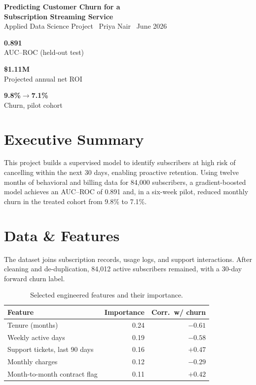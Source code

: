 \documentclass[11pt]{article}
\newcommand{\metric}[4]{%
\begin{minipage}[t]{0.31\linewidth}
\begin{tcolorbox}[colback=light,colframe=light,boxrule=0pt,arc=2mm,left=3mm,right=3mm,
  top=3mm,bottom=3mm,borderline west={2.5pt}{0pt}{#1},halign=center,height=2.1cm,valign=center]
{\LARGE\bfseries\color{navy}#2}\\[2pt]{\scriptsize\color{mist}#3}
\end{tcolorbox}
\end{minipage}}
\begin{document}
\begin{tcolorbox}[colback=navy,colframe=navy,arc=3mm,left=12pt,top=9pt,bottom=9pt]
{\color{white}\fontsize{20}{22}\selectfont\bfseries Predicting Customer Churn for a\\ Subscription Streaming Service}\\[3pt]
{\color{accent!50}\small Applied Data Science Project \textbullet\ Priya Nair \textbullet\ June 2026}
\end{tcolorbox}

\vspace{2pt}
\noindent
\metric{accent}{0.891}{AUC--ROC (held-out test)}{}\hfill
\metric{good}{\$1.11M}{Projected annual net ROI}{}\hfill
\metric{bad}{9.8\%$\to$7.1\%}{Churn, pilot cohort}{}

\section{Executive Summary}
This project builds a supervised model to identify subscribers at high risk of cancelling
within the next 30 days, enabling proactive retention. Using twelve months of behavioral and
billing data for 84,000 subscribers, a gradient-boosted model achieves an AUC--ROC of 0.891
and, in a six-week pilot, reduced monthly churn in the treated cohort from 9.8\% to 7.1\%.

\section{Data \& Features}
The dataset joins subscription records, usage logs, and support interactions. After cleaning
and de-duplication, 84,012 active subscribers remained, with a 30-day forward churn label.

\begin{table}[ht]\centering
\caption{Selected engineered features and their importance.}
\begin{tabularx}{\linewidth}{@{}X r r@{}}
\toprule
\textbf{Feature} & \textbf{Importance} & \textbf{Corr.\ w/ churn}\\
\midrule
Tenure (months)              & 0.24 & $-0.61$\\
Weekly active days           & 0.19 & $-0.58$\\
Support tickets, last 90 days & 0.16 & $+0.47$\\
Monthly charges              & 0.12 & $-0.29$\\
Month-to-month contract flag & 0.11 & $+0.42$\\
\bottomrule
\end{tabularx}
\end{table}
\end{document}

